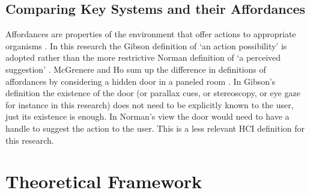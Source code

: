         \subsection{Comparing Key Systems and their Affordances}
Affordances are properties of the environment that offer actions to appropriate organisms \cite{gibson2014ecological}. In this research the Gibson definition of `an action possibility' is adopted rather than the more restrictive Norman definition of `a perceived suggestion' \cite{norman2002psychopathology}. McGrenere and Ho sum up the difference in definitions of affordances by considering a hidden door in a paneled room \cite{McGrenere2000}. In Gibson's definition the existence of the door (or parallax cues, or stereoscopy, or eye gaze for instance in this research) does not need to be explicitly known to the user, just its existence is enough. In Norman's view the door would need to have a handle to suggest the action to the user. This is a less relevant HCI definition for this research.\\

\section{Theoretical Framework}
        
